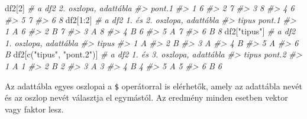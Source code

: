 \documentclass[
]{book}
\newenvironment{Shaded}{\begin{snugshade}}{\end{snugshade}}
\newcommand{\CommentTok}[1]{\textcolor[rgb]{0.56,0.35,0.01}{\textit{#1}}}
\newcommand{\DecValTok}[1]{\textcolor[rgb]{0.00,0.00,0.81}{#1}}
\newcommand{\FloatTok}[1]{\textcolor[rgb]{0.00,0.00,0.81}{#1}}
\newcommand{\FunctionTok}[1]{\textcolor[rgb]{0.00,0.00,0.00}{#1}}
\newcommand{\NormalTok}[1]{#1}
\newcommand{\SpecialCharTok}[1]{\textcolor[rgb]{0.00,0.00,0.00}{#1}}
\newcommand{\StringTok}[1]{\textcolor[rgb]{0.31,0.60,0.02}{#1}}
\begin{document}
\begin{Shaded}
\begin{Highlighting}[]
\NormalTok{df2[}\DecValTok{2}\NormalTok{]                    }\CommentTok{\# a df2 2. oszlopa, adattábla}
\CommentTok{\#\textgreater{}   pont.1}
\CommentTok{\#\textgreater{} 1      6}
\CommentTok{\#\textgreater{} 2      7}
\CommentTok{\#\textgreater{} 3      8}
\CommentTok{\#\textgreater{} 4      6}
\CommentTok{\#\textgreater{} 5      7}
\CommentTok{\#\textgreater{} 6      8}
\NormalTok{df2[}\DecValTok{1}\SpecialCharTok{:}\DecValTok{2}\NormalTok{]                  }\CommentTok{\# a df2 1. és 2. oszlopa, adattábla}
\CommentTok{\#\textgreater{}   tipus pont.1}
\CommentTok{\#\textgreater{} 1     A      6}
\CommentTok{\#\textgreater{} 2     B      7}
\CommentTok{\#\textgreater{} 3     A      8}
\CommentTok{\#\textgreater{} 4     B      6}
\CommentTok{\#\textgreater{} 5     A      7}
\CommentTok{\#\textgreater{} 6     B      8}
\NormalTok{df2[}\StringTok{"tipus"}\NormalTok{]              }\CommentTok{\# a df2 1. oszlopa, adattábla}
\CommentTok{\#\textgreater{}   tipus}
\CommentTok{\#\textgreater{} 1     A}
\CommentTok{\#\textgreater{} 2     B}
\CommentTok{\#\textgreater{} 3     A}
\CommentTok{\#\textgreater{} 4     B}
\CommentTok{\#\textgreater{} 5     A}
\CommentTok{\#\textgreater{} 6     B}
\NormalTok{df2[}\FunctionTok{c}\NormalTok{(}\StringTok{"tipus"}\NormalTok{, }\StringTok{"pont.2"}\NormalTok{)] }\CommentTok{\# a df2 1. és 3. oszlopa, adattábla}
\CommentTok{\#\textgreater{}   tipus pont.2}
\CommentTok{\#\textgreater{} 1     A      1}
\CommentTok{\#\textgreater{} 2     B      2}
\CommentTok{\#\textgreater{} 3     A      3}
\CommentTok{\#\textgreater{} 4     B      4}
\CommentTok{\#\textgreater{} 5     A      5}
\CommentTok{\#\textgreater{} 6     B      6}
\end{Highlighting}
\end{Shaded}

Az adattábla egyes oszlopai a \texttt{\$} operátorral is elérhetők, amely az adattábla nevét és az oszlop nevét választja el egymástól. Az eredmény minden esetben vektor vagy faktor lesz.

\begin{Shaded}
\end{Shaded}
\end{document}

